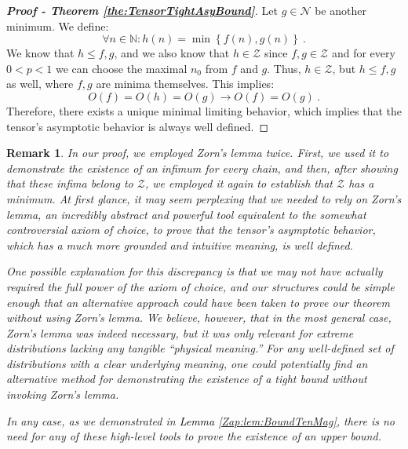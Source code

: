 \documentclass{article} %
\newtheorem{remark}{Remark}
[section]
\begin{document}
\begin{proof}[\textbf{Proof - Theorem \ref{the:TensorTightAsyBound}}]
Let \(g\in\mathcal{N}\) be another minimum. We define:
\begin{equation}
\forall n\in\mathbb{N}:
h\left(n\right)=\min\left\{ f\left(n\right),g\left(n\right)\right\}  \ .
\end{equation}
We know that \(h\leq f,g\), and we also know that \(h\in\mathcal{Z}\) since \(f,g\in\mathcal{Z}\) and for every \(0<p<1\) we can choose the maximal \(n_0\) from \(f\) and \(g\). Thus, \(h\in \mathcal{Z}\), but \(h\leq f,g\) as well, where \(f,g\) are minima themselves. This implies:
\begin{equation}
    O\left(f\right)=O\left(h\right)=O\left(g\right)\rightarrow O\left(f\right)=O\left(g\right) \ .
\end{equation}
Therefore, there exists a unique minimal limiting behavior, which implies that the tensor's asymptotic behavior is always well defined.
\end{proof}

\begin{remark}
\textup{In our proof, we employed Zorn's lemma twice. First, we used it to demonstrate the existence of an infimum for every chain, and then, after showing that these infima belong to \(\mathcal{Z}\), we employed it again to establish that \(\mathcal{Z}\) has a minimum. At first glance, it may seem perplexing that we needed to rely on Zorn's lemma, an incredibly abstract and powerful tool equivalent to the somewhat controversial axiom of choice, to prove that the tensor's asymptotic behavior, which has a much more grounded and intuitive meaning, is well defined.}

\textup{One possible explanation for this discrepancy is that we may not have actually required the full power of the axiom of choice, and our structures could be simple enough that an alternative approach could have been taken to prove our theorem without using Zorn's lemma. We believe, however, that in the most general case, Zorn's lemma was indeed necessary, but it was only relevant for extreme distributions lacking any tangible ``physical meaning.'' For any well-defined set of distributions with a clear underlying meaning, one could potentially find an alternative method for demonstrating the existence of a tight bound without invoking Zorn's lemma.}

\textup{In any case, as we demonstrated in \textcolor{black}{Lemma} \ref{Zap:lem:BoundTenMag}, there is no need for any of these high-level tools to prove the existence of an upper bound.}
\end{remark}
\end{document}
